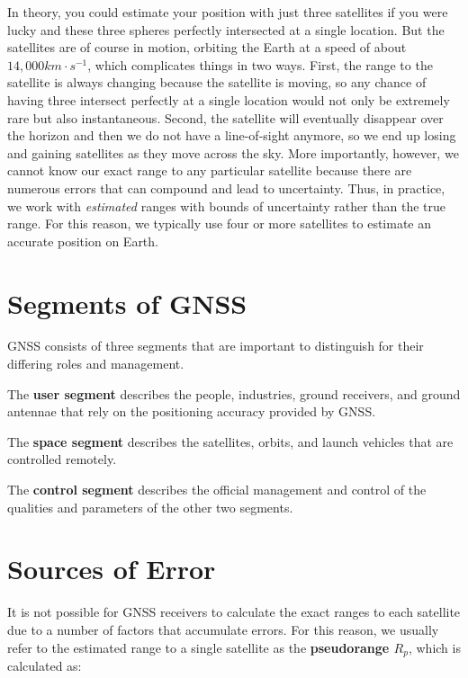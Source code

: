 \documentclass[
]{book}
\begin{document}
In theory, you could estimate your position with just three satellites if you were lucky and these three spheres perfectly intersected at a single location. But the satellites are of course in motion, orbiting the Earth at a speed of about \(14,000 km·s^{-1}\), which complicates things in two ways. First, the range to the satellite is always changing because the satellite is moving, so any chance of having three intersect perfectly at a single location would not only be extremely rare but also instantaneous. Second, the satellite will eventually disappear over the horizon and then we do not have a line-of-sight anymore, so we end up losing and gaining satellites as they move across the sky. More importantly, however, we cannot know our exact range to any particular satellite because there are numerous errors that can compound and lead to uncertainty. Thus, in practice, we work with \emph{estimated} ranges with bounds of uncertainty rather than the true range. For this reason, we typically use four or more satellites to estimate an accurate position on Earth.

\hypertarget{segments-of-gnss}{%
\section{Segments of GNSS}\label{segments-of-gnss}}

GNSS consists of three segments that are important to distinguish for their differing roles and management.

The \textbf{user segment} describes the people, industries, ground receivers, and ground antennae that rely on the positioning accuracy provided by GNSS.

The \textbf{space segment} describes the satellites, orbits, and launch vehicles that are controlled remotely.

The \textbf{control segment} describes the official management and control of the qualities and parameters of the other two segments.

\hypertarget{sources-of-error}{%
\section{Sources of Error}\label{sources-of-error}}

It is not possible for GNSS receivers to calculate the exact ranges to each satellite due to a number of factors that accumulate errors. For this reason, we usually refer to the estimated range to a single satellite as the \textbf{pseudorange \(R_p\)}, which is calculated as:
\end{document}

